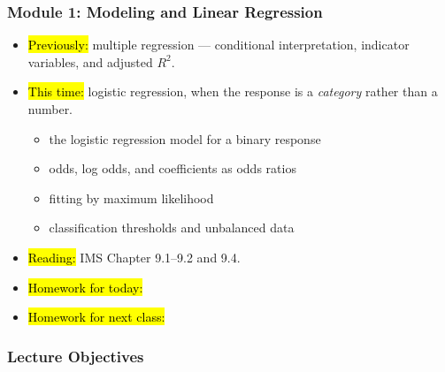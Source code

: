 

\begin{frame}
\frametitle{Module 1: Modeling and Linear Regression}
    \begin{itemize}
    \item \hl{Previously:} multiple regression --- conditional interpretation, indicator variables, and adjusted $R^2$.
    \item \hl{This time:} logistic regression, when the response is a \emph{category} rather than a number.
      \begin{itemize}
      \item the logistic regression model for a binary response
      \item odds, log odds, and coefficients as odds ratios
      \item fitting by maximum likelihood
      \item classification thresholds and unbalanced data
      \end{itemize}
    \item \hl{Reading:} IMS Chapter 9.1--9.2 and 9.4.
    \item \hl{Homework for today:}
    \item \hl{Homework for next class:}
    \end{itemize}
\end{frame}


\begin{frame}
    \frametitle{Lecture Objectives}
\end{frame}
